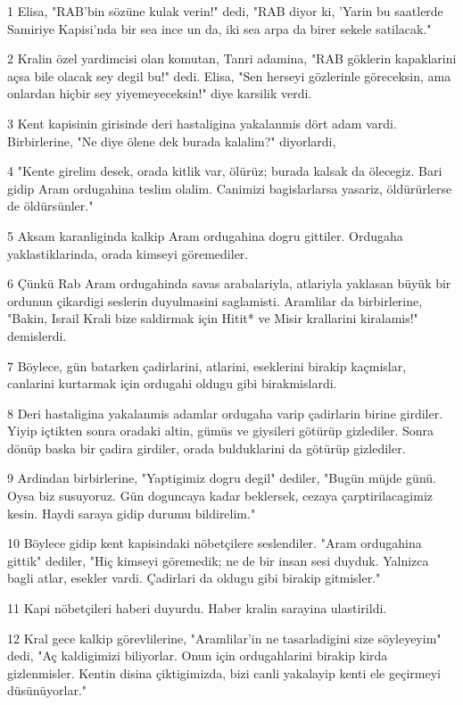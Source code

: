 \par 1 Elisa, "RAB'bin sözüne kulak verin!" dedi, "RAB diyor ki, 'Yarin bu saatlerde Samiriye Kapisi'nda bir sea ince un da, iki sea arpa da birer sekele satilacak."
\par 2 Kralin özel yardimcisi olan komutan, Tanri adamina, "RAB göklerin kapaklarini açsa bile olacak sey degil bu!" dedi. Elisa, "Sen herseyi gözlerinle göreceksin, ama onlardan hiçbir sey yiyemeyeceksin!" diye karsilik verdi.
\par 3 Kent kapisinin girisinde deri hastaligina yakalanmis dört adam vardi. Birbirlerine, "Ne diye ölene dek burada kalalim?" diyorlardi,
\par 4 "Kente girelim desek, orada kitlik var, ölürüz; burada kalsak da ölecegiz. Bari gidip Aram ordugahina teslim olalim. Canimizi bagislarlarsa yasariz, öldürürlerse de öldürsünler."
\par 5 Aksam karanliginda kalkip Aram ordugahina dogru gittiler. Ordugaha yaklastiklarinda, orada kimseyi göremediler.
\par 6 Çünkü Rab Aram ordugahinda savas arabalariyla, atlariyla yaklasan büyük bir ordunun çikardigi seslerin duyulmasini saglamisti. Aramlilar da birbirlerine, "Bakin, Israil Krali bize saldirmak için Hitit* ve Misir krallarini kiralamis!" demislerdi.
\par 7 Böylece, gün batarken çadirlarini, atlarini, eseklerini birakip kaçmislar, canlarini kurtarmak için ordugahi oldugu gibi birakmislardi.
\par 8 Deri hastaligina yakalanmis adamlar ordugaha varip çadirlarin birine girdiler. Yiyip içtikten sonra oradaki altin, gümüs ve giysileri götürüp gizlediler. Sonra dönüp baska bir çadira girdiler, orada bulduklarini da götürüp gizlediler.
\par 9 Ardindan birbirlerine, "Yaptigimiz dogru degil" dediler, "Bugün müjde günü. Oysa biz susuyoruz. Gün doguncaya kadar beklersek, cezaya çarptirilacagimiz kesin. Haydi saraya gidip durumu bildirelim."
\par 10 Böylece gidip kent kapisindaki nöbetçilere seslendiler. "Aram ordugahina gittik" dediler, "Hiç kimseyi göremedik; ne de bir insan sesi duyduk. Yalnizca bagli atlar, esekler vardi. Çadirlari da oldugu gibi birakip gitmisler."
\par 11 Kapi nöbetçileri haberi duyurdu. Haber kralin sarayina ulastirildi.
\par 12 Kral gece kalkip görevlilerine, "Aramlilar'in ne tasarladigini size söyleyeyim" dedi, "Aç kaldigimizi biliyorlar. Onun için ordugahlarini birakip kirda gizlenmisler. Kentin disina çiktigimizda, bizi canli yakalayip kenti ele geçirmeyi düsünüyorlar."
